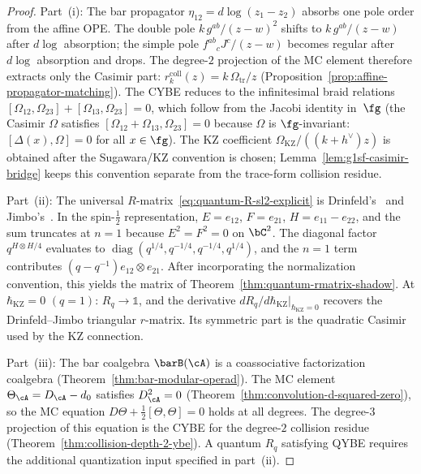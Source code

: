 \begin{proof}
Part~(i): The bar propagator
$\eta_{12} = d\log(z_1 - z_2)$ absorbs one pole order from the
affine OPE. The double pole $k\,g^{ab}/(z{-}w)^2$
shifts to $k\,g^{ab}/(z{-}w)$ after $d\log$ absorption; the simple pole
$f^{ab}{}_c J^c/(z{-}w)$ becomes regular after $d\log$
absorption and drops. The degree-$2$ projection of the MC element
 therefore extracts only the Casimir part:
 \(r^{\mathrm{coll}}_k(z)=k\,\Omega_{\mathrm{tr}}/z\)
 (Proposition~\ref{prop:affine-propagator-matching}). The CYBE
reduces to the infinitesimal braid relations
$[\Omega_{12}, \Omega_{23}] + [\Omega_{13}, \Omega_{23}] = 0$,
which follow from the Jacobi identity in~$\fg$ (the Casimir
$\Omega$ satisfies $[\Omega_{12} + \Omega_{13}, \Omega_{23}] = 0$
because $\Omega$ is $\fg$-invariant: $[\Delta(x), \Omega] = 0$
for all $x \in \fg$). The KZ coefficient
\(\Omega_{\mathrm{KZ}}/((k+h^\vee)z)\) is obtained after the
Sugawara/KZ convention is chosen; Lemma~\ref{lem:g1sf-casimir-bridge}
keeps this convention separate from the trace-form collision
residue.

Part~(ii): The universal $R$-matrix~\eqref{eq:quantum-R-sl2-explicit}
is Drinfeld's~\cite{Drinfeld85} and Jimbo's~\cite{Jimbo85}. In the
spin-$\frac{1}{2}$ representation, $E = e_{12}$, $F = e_{21}$,
$H = e_{11} - e_{22}$, and the sum truncates at $n = 1$ because
$E^2 = F^2 = 0$ on $\bC^2$. The diagonal factor $q^{H \otimes H/4}$
evaluates to $\operatorname{diag}(q^{1/4}, q^{-1/4}, q^{-1/4}, q^{1/4})$,
and the $n = 1$ term contributes $(q - q^{-1}) e_{12} \otimes e_{21}$.
After incorporating the normalization convention, this yields the
matrix of Theorem~\ref{thm:quantum-rmatrix-shadow}. At
\(\hbar_{\mathrm{KZ}} = 0\)
$(q = 1)$: $R_q \to \mathbb{1}$, and the derivative
$dR_q/d\hbar_{\mathrm{KZ}}|_{\hbar_{\mathrm{KZ}}=0}$ recovers
the Drinfeld--Jimbo triangular \(r\)-matrix. Its symmetric part is the
quadratic Casimir used by the KZ connection.

Part~(iii): The bar coalgebra $\barB(\cA)$ is a coassociative
factorization coalgebra
(Theorem~\ref{thm:bar-modular-operad}). The MC element
$\Theta_\cA = D_\cA - d_0$ satisfies
$D_\cA^2 = 0$ (Theorem~\ref{thm:convolution-d-squared-zero}),
so the MC equation $D\Theta + \frac{1}{2}[\Theta, \Theta] = 0$
holds at all degrees. The degree-$3$ projection of this equation is
the CYBE for the degree-$2$ collision residue
(Theorem~\ref{thm:collision-depth-2-ybe}). A quantum
\(R_q\) satisfying QYBE requires the additional quantization input
specified in part~(ii).
\end{proof}

